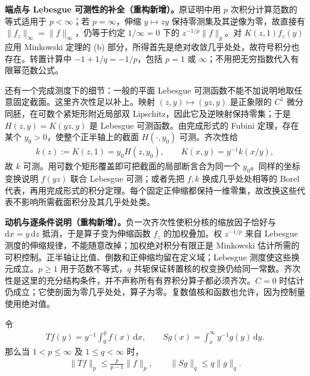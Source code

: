 \documentclass[../../main.tex]{subfiles}
\begin{document}
\begin{remark}
\textbf{端点与 Lebesgue 可测性的补全（重构新增）。}原证明中用 $p$ 次积分计算范数的等式适用于 $p<\infty$；若 $p=\infty$，伸缩 $y\mapsto zy$ 保持零测集及其逆像为零，故直接有 $\|f_z\|_\infty=\|f\|_\infty$，仍等于约定 $1/\infty=0$ 下的 $z^{-1/p}\|f\|_p$。对 $K(z,1)f_z(y)$ 应用 Minkowski 定理的 (b) 部分，所得首先是绝对收敛几乎处处，故符号积分也存在。转置计算中 $-1+1/q=-1/p$，包括 $p=1$ 或 $\infty$；不用把无穷指数代入有限幂范数公式。

还有一个完成测度下的细节：一般的平面 Lebesgue 可测函数不能不加说明地取任意固定截面。这里齐次性足以补上。映射 $(z,y)\mapsto(yz,y)$ 是正象限的 $C^1$ 微分同胚，在可数个紧矩形附近局部双 Lipschitz，因此它及逆映射保持零集；于是 $H(z,y)=K(yz,y)$ 是 Lebesgue 可测函数。由完成形式的 Fubini 定理，存在某个 $y_0>0$，使整个正半轴上的截面 $H(\cdot,y_0)$ 可测。齐次性给
\begin{align*}
k(z):=K(z,1)=y_0H(z,y_0),\qquad K(x,y)=y^{-1}k(x/y),
\end{align*}
故 $k$ 可测。用可数个矩形覆盖即可把截面的局部断言合为同一个 $y_0$。同样的坐标变换说明 $f(yz)$ 联合 Lebesgue 可测；或者先把 $f,k$ 换成几乎处处相等的 Borel 代表，再用完成形式的积分定理。每个固定正伸缩都保持一维零集，故改换这些代表不影响所需截面积分及其几乎处处类。
\end{remark}
\begin{remark}
\textbf{动机与逐条件说明（重构新增）。}负一次齐次性使积分核的缩放因子恰好与 $\mathrm dx=y\,\mathrm dz$ 抵消，于是算子变为伸缩函数 $f_z$ 的加权叠加。权 $z^{-1/p}$ 来自 Lebesgue 测度的伸缩规律，不能随意改掉；加权绝对积分有限正是 Minkowski 估计所需的可积控制。正半轴让比值、倒数和正伸缩均留在定义域；Lebesgue 测度使这些换元成立。$p\geqslant1$ 用于范数不等式，$q$ 共轭保证转置核的权变换仍给同一常数。齐次性是这里的充分结构条件，并不声称所有有界积分算子都必须齐次。$C=0$ 时估计仍成立；它使剖面为零几乎处处，算子为零。复数值核和函数也允许，因为控制量使用绝对值。
\end{remark}
\begin{corollary}\label{corollary:ch06-hardy-inequalities}
令
\begin{align*}
Tf(y)=y^{-1}\int_0^y f(x)\,\mathrm dx,\qquad
Sg(x)=\int_x^\infty y^{-1}g(y)\,\mathrm dy.
\end{align*}
那么当 $1<p\leqslant\infty$ 及 $1\leqslant q<\infty$ 时，
\begin{align*}
\|Tf\|_p\leqslant\frac{p}{p-1}\|f\|_p,\qquad
\|Sg\|_q\leqslant q\|g\|_q.
\end{align*}
\end{corollary}
\end{document}
